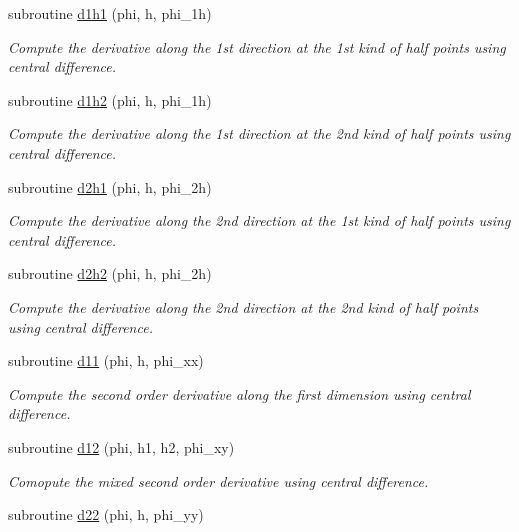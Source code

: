 \begin{DoxyCompactItemize}
subroutine \hyperlink{namespacemirana_acc84c99770972f6328e89ac04ac67153}{d1h1} (phi, h, phi\+\_\+1h)
\begin{DoxyCompactList}\small\item\em Compute the derivative along the 1st direction at the 1st kind of half points using central difference. \end{DoxyCompactList}\item 
subroutine \hyperlink{namespacemirana_a9d6168761271912ebfea872e9f322cdc}{d1h2} (phi, h, phi\+\_\+1h)
\begin{DoxyCompactList}\small\item\em Compute the derivative along the 1st direction at the 2nd kind of half points using central difference. \end{DoxyCompactList}\item 
subroutine \hyperlink{namespacemirana_a9341f957abd27c5132c557ae873055bd}{d2h1} (phi, h, phi\+\_\+2h)
\begin{DoxyCompactList}\small\item\em Compute the derivative along the 2nd direction at the 1st kind of half points using central difference. \end{DoxyCompactList}\item 
subroutine \hyperlink{namespacemirana_a4f47c93df57dd51d1414b2514fd1b339}{d2h2} (phi, h, phi\+\_\+2h)
\begin{DoxyCompactList}\small\item\em Compute the derivative along the 2nd direction at the 2nd kind of half points using central difference. \end{DoxyCompactList}\item 
subroutine \hyperlink{namespacemirana_ab9b1e7b5e38c6a020e05196b452e6d02}{d11} (phi, h, phi\+\_\+xx)
\begin{DoxyCompactList}\small\item\em Compute the second order derivative along the first dimension using central difference. \end{DoxyCompactList}\item 
subroutine \hyperlink{namespacemirana_ae9ee4058ea2b6238b6b745e4468f6a8e}{d12} (phi, h1, h2, phi\+\_\+xy)
\begin{DoxyCompactList}\small\item\em Comopute the mixed second order derivative using central difference. \end{DoxyCompactList}\item 
subroutine \hyperlink{namespacemirana_a9161b0947ddd188ac99d9246a1d81aed}{d22} (phi, h, phi\+\_\+yy)

\end{DoxyCompactItemize}

